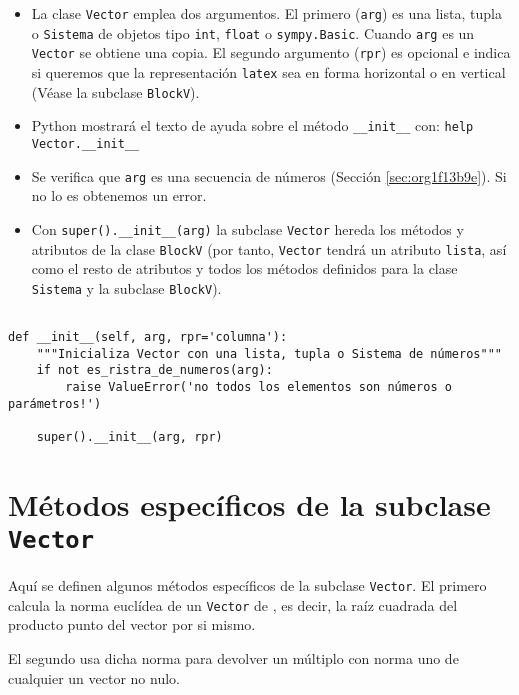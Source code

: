 \documentclass[11pt]{report}
\begin{document}
\begin{itemize}
\item La clase \texttt{Vector} emplea dos argumentos. El primero (\texttt{arg}) es una
lista, tupla o \texttt{Sistema} de objetos tipo \texttt{int}, \texttt{float} o
\texttt{sympy.Basic}. Cuando \texttt{arg} es un \texttt{Vector} se obtiene una copia. El
segundo argumento (\texttt{rpr}) es opcional e indica si queremos que la
representación \texttt{latex} sea en forma horizontal o en vertical (Véase
la subclase \texttt{BlockV}).

\item Python mostrará el texto de ayuda sobre el método \texttt{\_\_init\_\_} con:
\texttt{help Vector.\_\_init\_\_}

\item Se verifica que \texttt{arg} es una secuencia de números (Sección
\ref{sec:org1f13b9e}). Si no lo es obtenemos un error.

\item Con \texttt{super().\_\_init\_\_(arg)} la subclase \texttt{Vector} hereda los métodos
y atributos de la clase \texttt{BlockV} (por tanto, \texttt{Vector} tendrá un
atributo \texttt{lista}, así como el resto de atributos y todos los métodos
definidos para la clase \texttt{Sistema} y la subclase \texttt{BlockV}).
\end{itemize}


\begin{verbatim}

def __init__(self, arg, rpr='columna'):
    """Inicializa Vector con una lista, tupla o Sistema de números"""                       
    if not es_ristra_de_numeros(arg):
        raise ValueError('no todos los elementos son números o parámetros!')

    super().__init__(arg, rpr)

\end{verbatim}

\section{Métodos específicos de la subclase \texttt{Vector}}
\label{sec:org6506261}

Aquí se definen algunos métodos específicos de la subclase
\texttt{Vector}. El primero calcula la norma euclídea de un \texttt{Vector} de
\R[n], es decir, la raíz cuadrada del producto punto del vector por si
mismo.

El segundo usa dicha norma para devolver un múltiplo con norma uno de
cualquier un vector no nulo.
\end{document}
